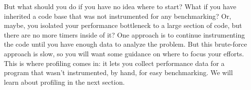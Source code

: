 But what should you do if you have no idea where to start? What if you have inherited a code base that was not instrumented for any benchmarking? Or, maybe, you isolated your performance bottleneck to a large section of code, but there are no more timers  inside of it? One approach is to continue instrumenting the code until you have enough data to analyze the problem. But this brute-force approach is slow, so you will want some guidance on where to focus your efforts. This is where profiling comes in: it lets you collect performance data for a program that wasn't instrumented, by hand, for easy benchmarking. We will learn about profiling in the next section.







